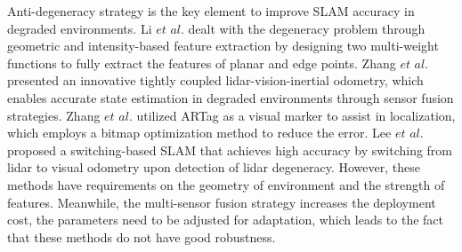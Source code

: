 Anti-degeneracy strategy is the key element to improve SLAM accuracy in degraded environments.
Li $\textit{et al.}$ \cite{li2022intensity} dealt with the degeneracy problem through geometric and intensity-based feature extraction by designing two multi-weight functions to fully extract the features of planar and edge points. Zhang $\textit{et al.}$ \cite{zhang2024lvio} presented an innovative tightly coupled lidar-vision-inertial odometry, which enables accurate state estimation in degraded environments through sensor fusion strategies. Zhang $\textit{et al.}$ \cite{zhang2023graph} utilized ARTag as a visual marker to assist in localization, which employs a bitmap optimization method to reduce the error. Lee $\textit{et al.}$ \cite{lee2024switch} proposed a switching-based SLAM that achieves high accuracy by switching from lidar to visual odometry upon detection of lidar degeneracy. 
However, these methods have requirements on the geometry of environment and the strength of features. Meanwhile, the multi-sensor fusion strategy increases the deployment cost, the parameters need to be adjusted for adaptation, which leads to the fact that these methods do not have good robustness.